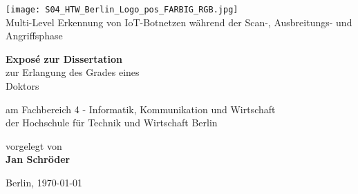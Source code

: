 \documentclass[
    a4paper,
    pagesize,
	pdftex,
    12pt,
]{scrartcl}
\begin{document}
\begin{titlepage}
    \begin{center}
        
        \texttt{[image: S04\_HTW\_Berlin\_Logo\_pos\_FARBIG\_RGB.jpg]} \\
        \vspace{1.0cm}
         Multi-Level Erkennung von IoT-Botnetzen während der Scan-, Ausbreitungs- und Angriffsphase
             
        \vspace{1.5cm}
 
        \textbf{Exposé zur Dissertation} \\    
        zur Erlangung des Grades eines\\
        Doktors

        \vspace{1.5cm}
        am Fachbereich 4 - Informatik, Kommunikation und Wirtschaft\\
        der Hochschule für Technik und Wirtschaft Berlin\\
        
        \vspace{1.5cm}

        vorgelegt von \\
        \textbf{Jan Schröder}
      
        \vspace{1.5cm}    
        Berlin, \today\\
        
             
    \end{center}
\end{titlepage}


\tableofcontents
\newpage



\newpage

\newpage

\newpage

\newpage

\newpage

\newpage

\newpage



\end{document}
